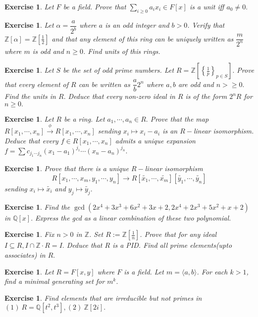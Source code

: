\documentclass[11pt]{amsart}
\newtheorem{ex}[theorem]{Exercise}
\newcommand{\QQ}{\mathbb Q}
\newcommand{\ZZ}{\mathbb Z}
\newcommand{\gen}[1]{\langle#1\rangle}
\begin{document}
\begin{ex}
Let $F$ be a field. Prove that $\displaystyle\sum_{i\geq 0} a_ix_i \in F[x]$ is a unit iff $a_0\neq 0.$
\end{ex}
\begin{ex}
Let $\alpha=\dfrac{a}{2^b}$ where $a$ is an odd integer and $b>0$. Verify that ${\ZZ}[\alpha]={\ZZ}\left[\frac{1}{2}\right]$ and that any element of this ring can be uniquely written as $\dfrac{m}{2^n}$ where $m$ is odd and $n\geq 0$. Find units of this rings.
\end{ex}
\begin{ex}
Let $S$ be the set of odd prime numbers. Let $R={\ZZ}\left[\left\lbrace\frac{1}{p}\right\rbrace_{p\in S}\right].$ Prove that every element of $R$ can be written as $\dfrac{a}{b}2^n$ where $a,b$ are odd and $n>\geq 0.$ Find the units in $R.$ Deduce that every non-zero ideal in $R$ is of the form $2^nR$ for $n\geq 0.$
\end{ex}
\begin{ex}
Let $R$ be a ring. Let $a_1,\cdots ,a_n\in R.$ Prove that the map $R[x_1,\cdots ,x_n]\stackrel{\phi}{\longrightarrow}R[x_1,\cdots ,x_n]$ sending $x_i\mapsto x_i-a_i$ is an $R-$linear isomorphism. Deduce that every $f\in R[x_1,\cdots ,x_n]$ admits a unique expansion $f=\sum c_{j_1\cdots j_n}(x_1-a_1)^{j_1}\cdots (x_n-a_n)^{j_n}.$
\end{ex}
\begin{ex}
Prove that there is a unique $R-$linear isomorphism $$R[x_1,\cdots ,x_m,y_1,\cdots ,y_n]\rightarrow R[\tilde{x_1},\cdots ,\tilde{x_m}][\tilde{y_1},\cdots ,\tilde{y_n}]$$ sending $x_i\mapsto \tilde{x_i}$ and $y_j\mapsto \tilde{y_j}.$
\end{ex}
\begin{ex}
Find the $\gcd (2x^4+3x^3+6x^2+3x+2,2x^4+2x^3+5x^2+x+2)$ in ${\QQ}[x].$ Express the gcd as a linear combination of these two polynomial.
\end{ex}
\begin{ex}
Fix $n>0$ in ${\ZZ}$. Set $R:={\ZZ}[\frac{1}{n}]$. Prove that for any ideal $I\subseteq R, I\cap {\ZZ}\cdot R=I.$ Deduce that $R$ is a PID. Find all prime elements(upto associates) in $R.$
\end{ex}
\begin{ex}
Let $R=F[x,y]$ where $F$ is a field. Let $m=\gen{a,b}$. For each $k>1$, find a minimal generating set for $m^k.$
\end{ex}
\begin{ex}
Find elements that are irreducible but not primes in $(1)~R={\QQ}[t^2,t^3],(2)~{\ZZ}[2i].$
\end{ex}
\end{document}
